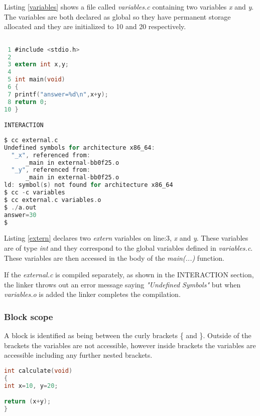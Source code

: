 Listing \ref{variables} shows a file called \textit{variables.c} containing two variables \textit{x} and \textit{y}. The variables are both declared as global so they have permanent storage allocated and they are initialized to 10 and 20 respectively. 

\begin{lstlisting}[language=C,caption={File external.c, extern used to access variables in another file},captionpos=b,label=extern]
 
 1 #include <stdio.h>
 2
 3 extern int x,y; 
 4 
 5 int main(void)
 6 {
 7 printf("answer=%d\n",x+y);
 8 return 0;
10 }

INTERACTION
 
$ cc external.c
Undefined symbols for architecture x86_64:
  "_x", referenced from:
      _main in external-bb0f25.o
  "_y", referenced from:
      _main in external-bb0f25.o
ld: symbol(s) not found for architecture x86_64
$ cc -c variables
$ cc external.c variables.o
$ ./a.out
answer=30
$

\end{lstlisting}


Listing \ref{extern} declares two \textit{extern} variables on line:3, \textit{x} and \textit{y}. These variables are of type \textit{int} and they correspond to the global variables defined in \textit{variables.c}. These variables are then accessed in the body of the \textit{main(...)} function. 

If the \textit{external.c} is compiled separately, as shown in the INTERACTION section, the linker throws out an error message saying \textit{"Undefined Symbols"} but when \textit{variables.o} is added the linker completes the compilation.

\subsubsection{Block scope}


A block is identified as being between the curly brackets \{ and \}. Outside of the brackets the variables are not accessible, however inside brackets the variables are accessible including any further nested brackets.\\

\begin{lstlisting}[language=C,caption={File: block1.c, block scope},captionpos=b,label=block1]
int calculate(void)
{
int x=10, y=20;

return (x+y);
}
\end{lstlisting}

